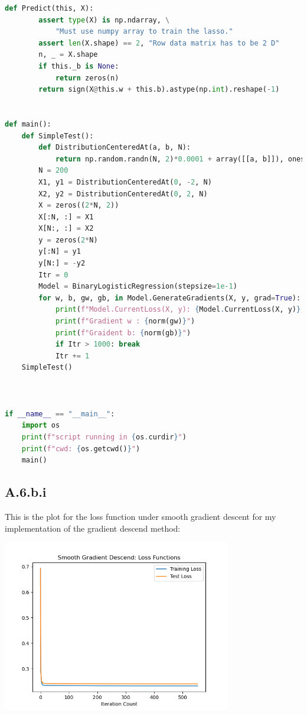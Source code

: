\documentclass[]{article}
\begin{document}
\begin{lstlisting}[language=python]
    def Predict(this, X):
        assert type(X) is np.ndarray, \
            "Must use numpy array to train the lasso."
        assert len(X.shape) == 2, "Row data matrix has to be 2 D"
        n, _ = X.shape
        if this._b is None:
            return zeros(n)
        return sign(X@this.w + this.b).astype(np.int).reshape(-1)


def main():
    def SimpleTest():
        def DistributionCenteredAt(a, b, N):
            return np.random.randn(N, 2)*0.0001 + array([[a, b]]), ones(N)
        N = 200
        X1, y1 = DistributionCenteredAt(0, -2, N)
        X2, y2 = DistributionCenteredAt(0, 2, N)
        X = zeros((2*N, 2))
        X[:N, :] = X1
        X[N:, :] = X2
        y = zeros(2*N)
        y[:N] = y1
        y[N:] = -y2
        Itr = 0
        Model = BinaryLogisticRegression(stepsize=1e-1)
        for w, b, gw, gb, in Model.GenerateGradients(X, y, grad=True):
            print(f"Model.CurrentLoss(X, y): {Model.CurrentLoss(X, y)}, w: {w}, b: {b}")
            print(f"Gradient w : {norm(gw)}")
            print(f"Graident b: {norm(gb)}")
            if Itr > 1000: break
            Itr += 1
    SimpleTest()



if __name__ == "__main__":
    import os
    print(f"script running in {os.curdir}")
    print(f"cwd: {os.getcwd()}")
    main()
        \end{lstlisting}
    \subsection*{A.6.b.i}
        This is the plot for the loss function under smooth gradient descent for my implementation of the gradient descend method: 
        \begin{center}
            \includegraphics[width=10cm]{A6-smooth-loss.png}
        \end{center}
\end{document}
